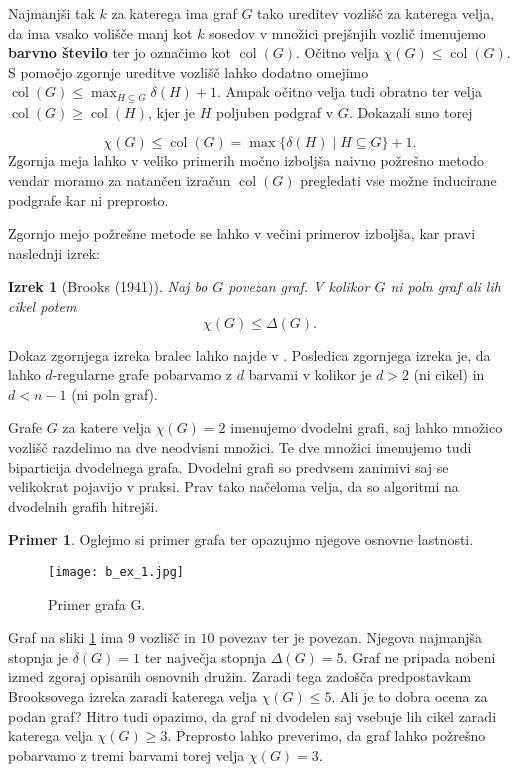 \documentclass[12pt,a4paper,twoside]{article}
\theoremstyle{definition} %
\newtheorem{primer}[definicija]{Primer}
\theoremstyle{plain} %
\newtheorem{izrek}[definicija]{Izrek}
\numberwithin{equation}{section}  %
\DeclareMathOperator{\col}{col}
\begin{document}
Najmanjši tak $k$ za katerega ima graf $G$ tako ureditev vozlišč za katerega velja, da ima vsako volišče manj kot $k$ sosedov v množici prejšnjih vozlič  imenujemo \textbf{barvno število} ter jo označimo kot $\col(G)$. Očitno velja $\chi(G) \le \col(G)$. S pomočjo zgornje ureditve vozlišč lahko dodatno omejimo $\col(G) \le  \max_{H \subseteq G} \delta(H) + 1$. Ampak očitno velja tudi obratno ter velja $\col(G) \ge \col(H)$, kjer je $H$ poljuben podgraf v $G$. Dokazali smo torej 

$$ \chi(G) \le \col(G) = \max\{\delta(H) \mid H \subseteq G\} + 1.$$
Zgornja meja lahko v veliko primerih močno izboljša naivno požrešno metodo vendar moramo za natančen izračun $\col(G)$ pregledati vse možne inducirane podgrafe kar ni preprosto.

Zgornjo mejo požrešne metode se lahko v večini primerov izboljša, kar pravi naslednji izrek:
\begin{izrek}[Brooks (1941)]
Naj bo $G$ povezan graf. V kolikor $G$ ni poln graf ali lih cikel potem
$$\chi(G) \le \Delta(G) .$$

\end{izrek}
Dokaz zgornjega izreka bralec lahko najde v \cite{maingraph}. Posledica zgornjega izreka je, da lahko $d$-regularne grafe pobarvamo z $d$ barvami v kolikor je $d> 2$ (ni cikel) in $d < n-1$ (ni poln graf).

Grafe $G$ za katere velja $\chi(G) = 2$ imenujemo dvodelni grafi, saj lahko množico vozlišč razdelimo na dve neodvisni množici. Te dve množici imenujemo tudi biparticija dvodelnega grafa. Dvodelni grafi so predvsem zanimivi saj se velikokrat pojavijo v praksi. Prav tako načeloma velja, da so algoritmi na dvodelnih grafih hitrejši. 

\begin{primer}
Oglejmo si primer grafa ter opazujmo njegove osnovne lastnosti.
 \begin{figure}[h!]
\caption{Primer grafa G.}
\label{basic_ex}
\centering
    \texttt{[image: b\_ex\_1.jpg]}
    \end{figure}
Graf na sliki \ref{basic_ex} ima $9$ vozlišč in $10$ povezav ter je povezan. Njegova najmanjša stopnja je $\delta(G) = 1$ ter največja stopnja $\Delta(G) = 5$. Graf ne pripada nobeni izmed zgoraj opisanih osnovnih družin. Zaradi tega zadošča predpostavkam Brooksovega izreka zaradi katerega velja $\chi(G) \le 5$. Ali je to dobra ocena za podan graf? Hitro tudi opazimo, da graf ni dvodelen saj vsebuje lih cikel zaradi katerega velja $\chi(G) \ge 3$. Preprosto lahko preverimo, da graf lahko požrešno pobarvamo z tremi barvami torej velja $\chi(G) = 3$.
\end{primer}
\end{document}
